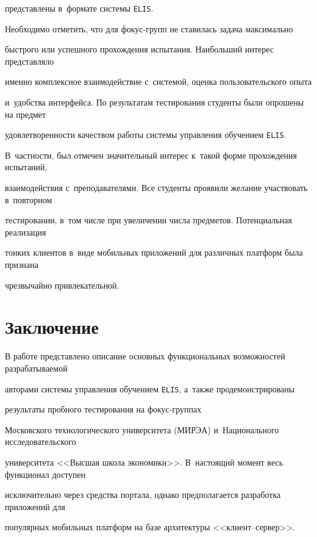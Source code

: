 пред\-став\-ле\-ны в~формате системы \verb"ELIS".





Необходимо отметить, что для фо\-кус-групп не ставилась задача максимально 


быст\-ро\-го или успешного прохождения испытания. Наибольший интерес пред\-став\-ля\-ло 


именно комплексное взаимодействие с~сис\-те\-мой, оценка пользовательского опыта 


и~удобства интерфейса. По результатам тестирования студенты были опрошены на предмет 


удовлетворенности качеством работы системы управления обучением \verb"ELIS". 


В~част\-ности, был отмечен значительный интерес к~такой форме прохождения испытаний, 


взаимодействия с~преподавателями. Все студенты проявили желание участвовать в~повторном 


тестировании, в~том числе при увеличении числа предметов. Потенциальная реализация 


тонких клиентов в~виде мобильных приложений для различных платформ была признана 


чрезвычайно привлекательной.





\section{Заключение}





В работе представлено описание основных функциональных возможностей разрабатываемой 


авторами системы управления обучением \verb"ELIS", а~также продемонстрированы 


результаты пробного тестирования на фо\-кус-груп\-пах 


Московского технологического университета (МИРЭА) и~Национального исследовательского 


университета <<Высшая школа экономики>>. В~настоящий момент весь функционал доступен 


исключительно через средства портала, однако предполагается разработка приложений для 


популярных мобильных платформ на базе архитектуры <<кли\-ент--сер\-вер>>. 


